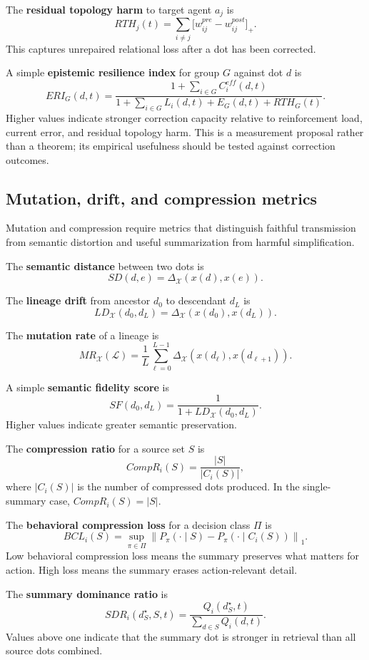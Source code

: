 \documentclass[11pt]{article}
\theoremstyle{remark}
\begin{document}
The \textbf{residual topology harm} to target agent $a_j$ is
$$
RTH_j(t)=\sum_{i\neq j}\big[w_{ij}^{pre}-w_{ij}^{post}\big]_+.
$$
This captures unrepaired relational loss after a dot has been corrected.

A simple \textbf{epistemic resilience index} for group $G$ against dot
$d$ is
$$
ERI_G(d,t)=
\frac{1+\sum_{i\in G}C_i^{eff}(d,t)}
{1+\sum_{i\in G}L_i(d,t)+E_G(d,t)+RTH_G(t)}.
$$
Higher values indicate stronger correction capacity relative to
reinforcement load, current error, and residual topology harm. This is a
measurement proposal rather than a theorem; its empirical usefulness
should be tested against correction outcomes.

\subsection{Mutation, drift, and compression metrics}\label{mutation-drift-and-compression-metrics}

Mutation and compression require metrics that distinguish faithful
transmission from semantic distortion and useful summarization from
harmful simplification.

The \textbf{semantic distance} between two dots is
$$
SD(d,e)=\Delta_{\mathcal X}(x(d),x(e)).
$$

The \textbf{lineage drift} from ancestor $d_0$ to descendant $d_L$ is
$$
LD_{\mathcal X}(d_0,d_L)=\Delta_{\mathcal X}(x(d_0),x(d_L)).
$$

The \textbf{mutation rate} of a lineage is
$$
MR_{\mathcal X}(\mathcal L)=\frac{1}{L}
\sum_{\ell=0}^{L-1}
\Delta_{\mathcal X}(x(d_{\ell}),x(d_{\ell+1})).
$$

A simple \textbf{semantic fidelity score} is
$$
SF(d_0,d_L)=\frac{1}{1+LD_{\mathcal X}(d_0,d_L)}.
$$
Higher values indicate greater semantic preservation.

The \textbf{compression ratio} for a source set $S$ is
$$
CompR_i(S)=\frac{|S|}{|C_i(S)|},
$$
where $|C_i(S)|$ is the number of compressed dots produced. In the
single-summary case, $CompR_i(S)=|S|$.

The \textbf{behavioral compression loss} for a decision class $\Pi$ is
$$
BCL_i(S)=\sup_{\pi\in\Pi}
\left\|P_{\pi}(\cdot\mid S)-P_{\pi}(\cdot\mid C_i(S))\right\|_1.
$$
Low behavioral compression loss means the summary preserves what matters
for action. High loss means the summary erases action-relevant detail.

The \textbf{summary dominance ratio} is
$$
SDR_i(d_S^\star,S,t)=\frac{Q_i(d_S^\star,t)}{\sum_{d\in S}Q_i(d,t)}.
$$
Values above one indicate that the summary dot is stronger in retrieval
than all source dots combined.
\end{document}

